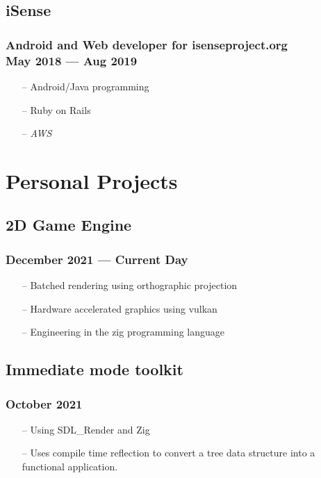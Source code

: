 \documentclass[11pt]{article}
\begin{document}
\begin{multicols}{2}
\subsection{iSense}
\subsubsection{Android and Web developer for isenseproject.org\\ May 2018 --- Aug 2019}
\begin{itemize}[noitemsep, topsep=0pt]
	\item[--] Android/Java programming
	\item[--] Ruby on Rails
	\item[--] \emph{AWS}
\end{itemize}

\columnbreak

\section{Personal Projects}

\subsection{2D Game Engine}
\subsubsection{December 2021 --- Current Day}
\begin{itemize}[noitemsep, topsep=0pt]
	\item[--] Batched rendering using orthographic projection
	\item[--] Hardware accelerated graphics using vulkan
	\item[--] Engineering in the zig programming language
\end{itemize}

\subsection{Immediate mode toolkit}
\subsubsection{October 2021}
\begin{itemize}[noitemsep, topsep=0pt]
	\item[--] Using SDL\_Render and Zig
	\item[--] Uses compile time reflection to convert
		a tree data structure into a functional
		application.
\end{itemize}


\end{multicols}
\end{document}
